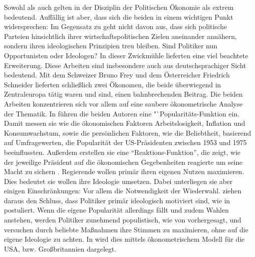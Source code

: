 Sowohl \textcite{Nordhaus1975} als auch \textcite{Hibbs1977} gelten in der Disziplin der Politischen Ökonomie als extrem bedeutend. Auffällig ist aber, dass sich die beiden in einem wichtigen Punkt widersprechen: Im Gegensatz zu \textcite{Nordhaus1975} geht \textcite{Hibbs1977} nicht davon aus, dass sich politische Parteien hinsichtlich ihrer wirtschaftspolitischen Zielen aneinander annähern, sondern ihren ideologischen Prinzipien treu bleiben. Sind Politiker nun Opportunisten oder Ideologen? In dieser Zwickmühle lieferten \textcite{Schneider1978a, Schneider1978b} eine viel beachtete Erweiterung. Diese Arbeiten sind insbesondere auch aus deutschsprachiger Sicht bedeutend. Mit dem Schweizer Bruno Frey und dem Österreicher Friedrich Schneider lieferten schließlich zwei Ökonomen, die beide überwiegend in Zentraleuropa tätig waren und sind, einen bahnbrechenden Beitrag. Die beiden Arbeiten konzentrieren sich vor allem auf eine saubere ökonometrische Analyse der Thematik. In \textcite[S. 175]{Schneider1978a} führen die beiden Autoren eine "`Popularitäts-Funktion ein. Damit messen sie wie die ökonomischen Faktoren Arbeitslosigkeit, Inflation und Konsumwachstum, sowie die persönlichen Faktoren, wie die Beliebtheit, basierend auf Umfragewerten, die Popularität der US-Präsidenten zwischen 1953 und 1975 beeinflussten. Außerdem erstellen sie eine "`Reaktions-Funktion"', die zeigt, wie der jeweilige Präsident auf die ökonomischen Gegebenheiten reagierte um seine Macht zu sichern \parencite[S. 178]{Schneider1978a}. Regierende wollen primär ihren eigenen Nutzen maximieren. Dies bedeutet sie wollen ihre Ideologie umsetzen. Dabei unterliegen sie aber einigen Einschränkungen: Vor allem die Notwendigkeit der Wiederwahl. \textcite[S. 189f]{Schneider1978a} ziehen daraus den Schluss, dass Politiker primär ideologisch motiviert sind, wie in \textcite{Hibbs1977} postuliert. Wenn die eigene Popularität allerdings fällt und zudem Wahlen anstehen, werden Politiker zunehmend populistisch, wie von \textcite{Nordhaus1975} vorhergesagt, und versuchen durch beliebte Maßnahmen ihre Stimmen zu maximieren, ohne auf die eigene Ideologie zu achten. In \textcite{Schneider1978a, Schneider1978b} wird dies mittels ökonometrischem Modell für die USA, bzw. Großbritannien dargelegt.


